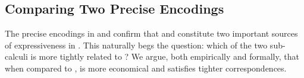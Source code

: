 \documentclass[preprint,11pt]{elsarticle}
\newtheorem{remark}{Remark}[section]
\begin{document}
{%
%


%

\subsection{Comparing Two Precise Encodings}\label{ss:compare}
The precise encodings  in   and 
confirm that \HO and \sessp constitute two important sources of expressiveness in \HOp.
This naturally begs the question: which of the two sub-calculi is more tightly related to \HOp?
We argue, both empirically and formally, that when compared to \sessp, \HO   is more economical and satisfies tighter correspondences.

}
\end{document}
